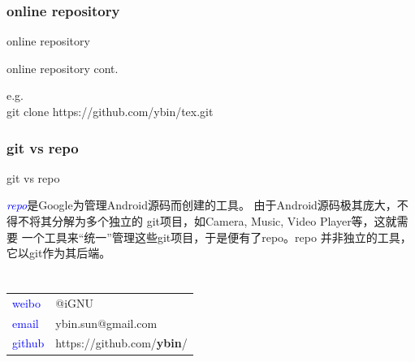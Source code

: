 ﻿\documentclass{beamer}
\begin{document}
\section[online repository]{online repository}
\begin{frame}{online repository}
\end{frame}
\begin{frame}{online repository cont.}
\begin{framedtext}
{
  e.g.\\[5pt]
  git clone https://github.com/ybin/tex.git
}
\end{framedtext}
\end{frame}

\section[git vs repo]{git vs repo}
\begin{frame}{git vs repo}
\begin{framedtext}
{
  \textcolor{blue}{\emph{repo}}是Google为管理Android源码而创建的工具。
  由于Android源码极其庞大，不得不将其分解为多个独立的
  git项目，如Camera, Music, Video Player等，这就需要
  一个工具来“统一”管理这些git项目，于是便有了repo。repo
  并非独立的工具，它以git作为其后端。
}
\end{framedtext}
\end{frame}

\part[\surrounded{/end}]{}
\begin{frame}{}
  \begin{framedtext}
    \begin{tabular}{ll}
      \textcolor{blue}{weibo} & @iGNU \\
      \textcolor{blue}{email} & ybin.sun@gmail.com \\
      \textcolor{blue}{github}& https://github.com/\textbf{ybin}/ \\
    \end{tabular}
  \end{framedtext}
\end{frame}
\end{document}
